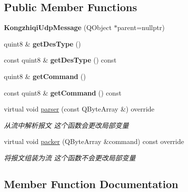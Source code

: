\subsection*{Public Member Functions}
\begin{DoxyCompactItemize}
\item 
\mbox{\label{class_kongzhiqi_udp_message_a630ef54c5798e2b019ab2152b067df1b}} 
{\bfseries Kongzhiqi\+Udp\+Message} (Q\+Object $\ast$parent=nullptr)
\item 
\mbox{\label{class_kongzhiqi_udp_message_a0e9efd97d06d138b58651e577ebd8726}} 
quint8 \& {\bfseries get\+Des\+Type} ()
\item 
\mbox{\label{class_kongzhiqi_udp_message_a92bd58750bd878b1a554af7771a62ede}} 
const quint8 \& {\bfseries get\+Des\+Type} () const
\item 
\mbox{\label{class_kongzhiqi_udp_message_a5474ebd7f1ab4a3d76cd488254f5c5b6}} 
quint8 \& {\bfseries get\+Command} ()
\item 
\mbox{\label{class_kongzhiqi_udp_message_adad6fceb0d1c0b7a120c7427366af3f7}} 
const quint8 \& {\bfseries get\+Command} () const
\item 
virtual void \mbox{\hyperlink{class_kongzhiqi_udp_message_ae86374489ef208d173e840b050f1b212}{parser}} (const Q\+Byte\+Array \&) override
\begin{DoxyCompactList}\small\item\em 从流中解析报文 这个函数会更改局部变量 \end{DoxyCompactList}\item 
virtual void \mbox{\hyperlink{class_kongzhiqi_udp_message_aa66ce04fb9924be5e181e574233bbeb7}{packer}} (Q\+Byte\+Array \&command) const override
\begin{DoxyCompactList}\small\item\em 将报文组装为流 这个函数不会更改局部变量 \end{DoxyCompactList}\end{DoxyCompactItemize}


\subsection{Member Function Documentation}
\mbox{\label{class_kongzhiqi_udp_message_aa66ce04fb9924be5e181e574233bbeb7}} 
